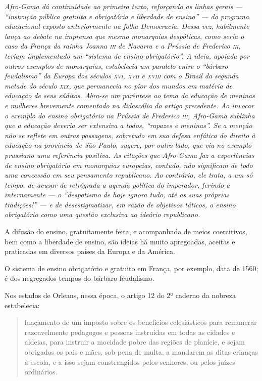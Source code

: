\begin{didascalia}\itshape
Afro-Gama dá continuidade ao primeiro texto, reforçando as
linhas gerais --- ``instrução pública gratuita e obrigatória e liberdade
de ensino'' --- do programa educacional exposto anteriormente na folha
\textnormal{Democracia}. Dessa vez, habilmente lança ao debate na imprensa que
mesmo monarquias despóticas, como seria o caso da França da rainha
Joanna \textsc{iii} de Navarra e a Prússia de Frederico \textsc{iii}, teriam implementado
um ``sistema de ensino obrigatório''. A ideia, apoiada por outros exemplos
de monarquias, estabelecia um paralelo entre o ``bárbaro feudalismo'' da
Europa dos séculos \textsc{xvi}, \textsc{xvii} e \textsc{xviii} com o Brasil da segunda metade do
século \textsc{xix}, que permanecia no pior dos mundos em matéria de educação de
seus súditos. Abra-se um parêntese ao tema da educação de meninas e
mulheres brevemente comentado na didascália do artigo precedente. Ao
invocar o exemplo do ensino obrigatório na Prússia de Frederico \textsc{iii},
Afro-Gama sublinha que a educação deveria ser extensiva a
todos, ``rapazes e meninas''. Se a menção não se reflete em outras
passagens, sobretudo em sua defesa enfática do direito à educação na
província de São Paulo, sugere, por outro lado, que via no exemplo
prussiano uma referência positiva. As citações que Afro-Gama
faz a experiências de ensino obrigatório em monarquias europeias,
contudo, não significam de todo uma concessão em seu pensamento
republicano. Ao contrário, ele trata, a um só tempo, de acusar de
retrógrada a agenda política do imperador, ferindo-a internamente --- o
``despotismo de hoje ignora tudo, até as suas próprias tradições!'' --- e
de desestigmatizar, em razão de objetivos táticos, o ensino obrigatório
como uma questão exclusiva ao ideário republicano.
\end{didascalia}



A difusão do ensino, gratuitamente feita, e acompanhada de meios
coercitivos, bem como a liberdade de ensino, são ideias há muito
apregoadas, aceitas e praticadas em diversos países da Europa e da
América.

O sistema de ensino obrigatório e gratuito em França, por exemplo, data
de 1560; é dos negregados tempos do bárbaro feudalismo.

Nos estados de Orleans, nessa época, o artigo 12 do 2º caderno da
nobreza estabelecia:


\begin{quote}
lançamento de um imposto sobre os benefícios eclesiásticos para
remunerar razoavelmente pedagogos e pessoas instruídas em todas as
cidades e aldeias, para instruir a mocidade pobre das regiões de
planície, e sejam obrigados os pais e mães, sob pena de multa, a
mandarem as ditas crianças à escola, e a isso sejam constrangidos pelos
senhores, ou pelos juízes ordinários.
\end{quote}

